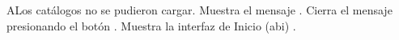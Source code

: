 \begin{UCtrayectoriaA}{A}{Los catálogos no se pudieron cargar.}
    \UCpaso Muestra el mensaje .
    \UCpaso[\UCactor] Cierra el mensaje presionando el botón .
    \UCpaso Muestra la interfaz de Inicio (abi) .
\end{UCtrayectoriaA}